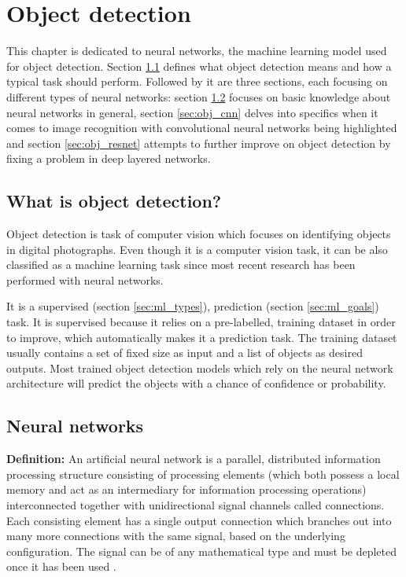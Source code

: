 \chapter{Object detection}
\label{chap:obj}

This chapter is dedicated to neural networks, the machine learning model used for object detection. Section \ref{sec:obj_what} defines what object detection means and how a typical task should perform. Followed by it are three sections, each focusing on different types of neural networks: section \ref{sec:obj_nn} focuses on basic knowledge about neural networks in general, section \ref{sec:obj_cnn} delves into specifics when it comes to image recognition with convolutional neural networks being highlighted and section \ref{sec:obj_resnet} attempts to further improve on object detection by fixing a problem in deep layered networks.

\section{What is object detection?}
\label{sec:obj_what}

Object detection is task of computer vision which focuses on identifying objects in digital photographs. Even though it is a computer vision task, it can be also classified as a machine learning task since most recent research has been performed with neural networks. 

It is a supervised (section \ref{sec:ml_types}), prediction (section \ref{sec:ml_goals}) task. It is supervised because it relies on a pre-labelled, training dataset in order to improve, which automatically makes it a prediction task. The training dataset usually contains a set of fixed size as input and a list of objects as desired outputs. Most trained object detection models which rely on the neural network architecture will predict the objects with a chance of confidence or probability.

\section{Neural networks}
\label{sec:obj_nn}

\textbf{Definition:} An artificial neural network is a parallel, distributed information processing structure consisting of processing elements (which both possess a local memory and act as an intermediary for information processing operations) interconnected together with unidirectional signal channels called connections. Each consisting element has a single output connection which branches out into many more connections with the same signal, based on the underlying configuration. The signal can be of any mathematical type and must be depleted once it has been used \cite{backpropagation}.

